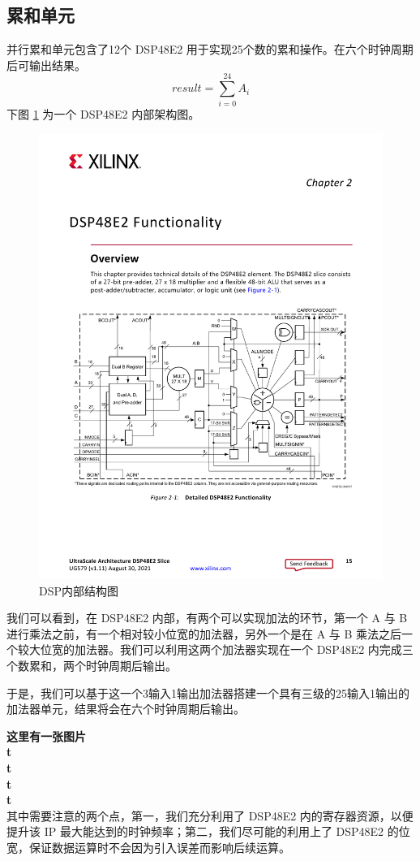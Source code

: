\documentclass[12pt, a4paper, oneside]{ctexbook}
\begin{document}
	\subsection{累和单元}
	并行累和单元包含了12个 DSP48E2 用于实现25个数的累和操作。在六个时钟周期后可输出结果。
	$$
	result = \sum_{i=0}^{24}A_i
	$$
	下图 \ref{DSP} 为一个 DSP48E2 内部架构图。
		\begin{figure}[h]
		\centering
		\includegraphics[scale=0.87]{pic/DSP}
		\caption{DSP内部结构图}
		\label{DSP}
		\end{figure}
	\par 我们可以看到，在 DSP48E2 内部，有两个可以实现加法的环节，第一个 A 与 B 进行乘法之前，有一个相对较小位宽的加法器，另外一个是在 A 与 B 乘法之后一个较大位宽的加法器。我们可以利用这两个加法器实现在一个 DSP48E2 内完成三个数累和，两个时钟周期后输出。\par 于是，我们可以基于这一个3输入1输出加法器搭建一个具有三级的25输入1输出的加法器单元，结果将会在六个时钟周期后输出。\par 
	\textbf{这里有一张图片\\t\\t\\t\\t\\}
	其中需要注意的两个点，第一，我们充分利用了 DSP48E2 内的寄存器资源，以便提升该 IP 最大能达到的时钟频率；第二，我们尽可能的利用上了 DSP48E2 的位宽，保证数据运算时不会因为引入误差而影响后续运算。
	
\end{document}

